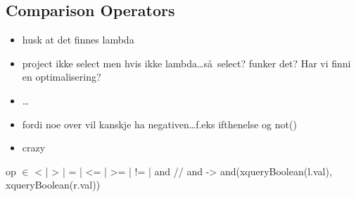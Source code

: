 \subsection{Comparison Operators}
\label{sect:translation:mXr:compOps}

\begin{itemize}
  \item husk at det finnes lambda
  \item project ikke select men hvis ikke lambda\ldots s\aa~select? funker det? Har vi finni en optimalisering?
  \item \ldots
  \item fordi noe over vil kanskje ha negativen\ldots f.eks ifthenelse og not()
  \item crazy
\end{itemize}
op $\in$ {< | > | = | <= | >= | != | and }        // and ->
and(xqueryBoolean(l.val), xqueryBoolean(r.val))
